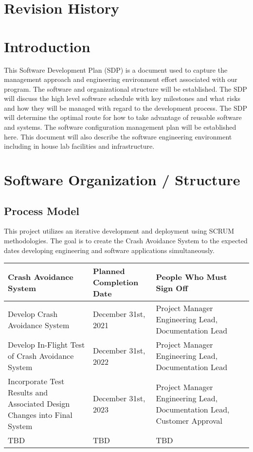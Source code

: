\documentclass[12pt]{article}
\begin{document}
\tableofcontents   
\section{Revision History}
\section{Introduction}
	This Software Development Plan (SDP) is a document used to capture the management approach and engineering environment effort associated with our program. The software and organizational structure will be established. The SDP will discuss the high level software schedule with key milestones and what risks and how they will be managed with regard to the development process. The SDP will determine the optimal route for how to take advantage of reusable software and systems. The software configuration management plan will be established here. This document will also describe the software engineering environment including in house lab facilities and infrastructure. 
\newpage

\section{Software Organization / Structure}
	\subsection{Process Model}
		This project utilizes an iterative development and deployment using SCRUM methodologies. The goal is to create the Crash Avoidance System to the expected dates developing engineering and software applications simultaneously.
		\begin{table}[!h]
			\centering
			\begin{tabularx}{\textwidth}{|X|X|X|}
				\hline \textbf{Crash Avoidance System} & \textbf{Planned Completion Date} & \textbf{People Who Must Sign Off}							      \\
				\hline Develop Crash Avoidance System  & December 31st, 2021 			  & Project Manager Engineering Lead, Documentation Lead 					\\
				\hline Develop In-Flight Test of 
					   Crash Avoidance System 		   & December 31st, 2022 			  & Project Manager Engineering Lead, Documentation Lead 				\\ 
		       	\hline Incorporate Test Results 
		       		   and Associated Design Changes 
		       		   into Final System 			   & December 31st, 2023 			  & Project Manager Engineering Lead, Documentation Lead, Customer Approval  \\
		        \hline TBD 						   	   & TBD					 		  & TBD 									\\ 
		        \hline
			\end{tabularx}
		\end{table}
\end{document}
